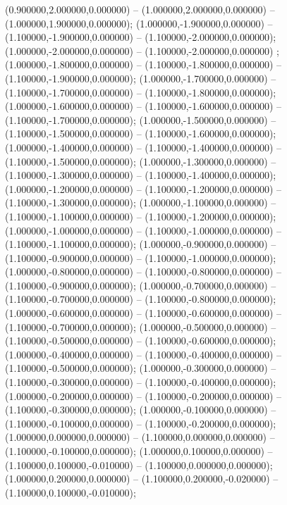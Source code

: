  (0.900000,2.000000,0.000000) -- (1.000000,2.000000,0.000000) -- (1.000000,1.900000,0.000000);
 (1.000000,-1.900000,0.000000) -- (1.100000,-1.900000,0.000000) -- (1.100000,-2.000000,0.000000);
 (1.000000,-2.000000,0.000000) -- (1.100000,-2.000000,0.000000) ;
 (1.000000,-1.800000,0.000000) -- (1.100000,-1.800000,0.000000) -- (1.100000,-1.900000,0.000000);
 (1.000000,-1.700000,0.000000) -- (1.100000,-1.700000,0.000000) -- (1.100000,-1.800000,0.000000);
 (1.000000,-1.600000,0.000000) -- (1.100000,-1.600000,0.000000) -- (1.100000,-1.700000,0.000000);
 (1.000000,-1.500000,0.000000) -- (1.100000,-1.500000,0.000000) -- (1.100000,-1.600000,0.000000);
 (1.000000,-1.400000,0.000000) -- (1.100000,-1.400000,0.000000) -- (1.100000,-1.500000,0.000000);
 (1.000000,-1.300000,0.000000) -- (1.100000,-1.300000,0.000000) -- (1.100000,-1.400000,0.000000);
 (1.000000,-1.200000,0.000000) -- (1.100000,-1.200000,0.000000) -- (1.100000,-1.300000,0.000000);
 (1.000000,-1.100000,0.000000) -- (1.100000,-1.100000,0.000000) -- (1.100000,-1.200000,0.000000);
 (1.000000,-1.000000,0.000000) -- (1.100000,-1.000000,0.000000) -- (1.100000,-1.100000,0.000000);
 (1.000000,-0.900000,0.000000) -- (1.100000,-0.900000,0.000000) -- (1.100000,-1.000000,0.000000);
 (1.000000,-0.800000,0.000000) -- (1.100000,-0.800000,0.000000) -- (1.100000,-0.900000,0.000000);
 (1.000000,-0.700000,0.000000) -- (1.100000,-0.700000,0.000000) -- (1.100000,-0.800000,0.000000);
 (1.000000,-0.600000,0.000000) -- (1.100000,-0.600000,0.000000) -- (1.100000,-0.700000,0.000000);
 (1.000000,-0.500000,0.000000) -- (1.100000,-0.500000,0.000000) -- (1.100000,-0.600000,0.000000);
 (1.000000,-0.400000,0.000000) -- (1.100000,-0.400000,0.000000) -- (1.100000,-0.500000,0.000000);
 (1.000000,-0.300000,0.000000) -- (1.100000,-0.300000,0.000000) -- (1.100000,-0.400000,0.000000);
 (1.000000,-0.200000,0.000000) -- (1.100000,-0.200000,0.000000) -- (1.100000,-0.300000,0.000000);
 (1.000000,-0.100000,0.000000) -- (1.100000,-0.100000,0.000000) -- (1.100000,-0.200000,0.000000);
 (1.000000,0.000000,0.000000) -- (1.100000,0.000000,0.000000) -- (1.100000,-0.100000,0.000000);
 (1.000000,0.100000,0.000000) -- (1.100000,0.100000,-0.010000) -- (1.100000,0.000000,0.000000);
 (1.000000,0.200000,0.000000) -- (1.100000,0.200000,-0.020000) -- (1.100000,0.100000,-0.010000);
